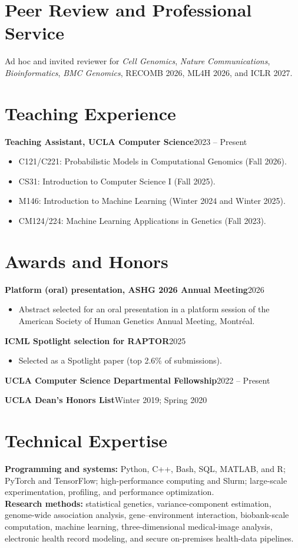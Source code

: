 \documentclass[10pt,letterpaper]{article}
\newcommand{\entryb}[2]{\noindent\textbf{#1}\hfill #2\par}
\begin{document}
\section{Peer Review and Professional Service}
Ad hoc and invited reviewer for \emph{Cell Genomics}, \emph{Nature Communications}, \emph{Bioinformatics}, \emph{BMC Genomics}, RECOMB 2026, ML4H 2026, and ICLR 2027.

\section{Teaching Experience}
\entryb{Teaching Assistant, UCLA Computer Science}{2023 -- Present}
\begin{itemize}
\item C121/C221: Probabilistic Models in Computational Genomics (Fall 2026).
\item CS31: Introduction to Computer Science I (Fall 2025).
\item M146: Introduction to Machine Learning (Winter 2024 and Winter 2025).
\item CM124/224: Machine Learning Applications in Genetics (Fall 2023).
\end{itemize}

\section{Awards and Honors}
\entryb{Platform (oral) presentation, ASHG 2026 Annual Meeting}{2026}
\begin{itemize}
\item Abstract selected for an oral presentation in a platform session of the American Society of Human Genetics Annual Meeting, Montr\'eal.
\end{itemize}
\entryb{ICML Spotlight selection for RAPTOR}{2025}
\begin{itemize}
\item Selected as a Spotlight paper (top 2.6\% of submissions).
\end{itemize}
\entryb{UCLA Computer Science Departmental Fellowship}{2022 -- Present}
\entryb{UCLA Dean's Honors List}{Winter 2019; Spring 2020}

\section{Technical Expertise}
\textbf{Programming and systems:} Python, C++, Bash, SQL, MATLAB, and R; PyTorch and TensorFlow; high-performance computing and Slurm; large-scale experimentation, profiling, and performance optimization.\\
\textbf{Research methods:} statistical genetics, variance-component estimation, genome-wide association analysis, gene--environment interaction, biobank-scale computation, machine learning, three-dimensional medical-image analysis, electronic health record modeling, and secure on-premises health-data pipelines.
\end{document}
